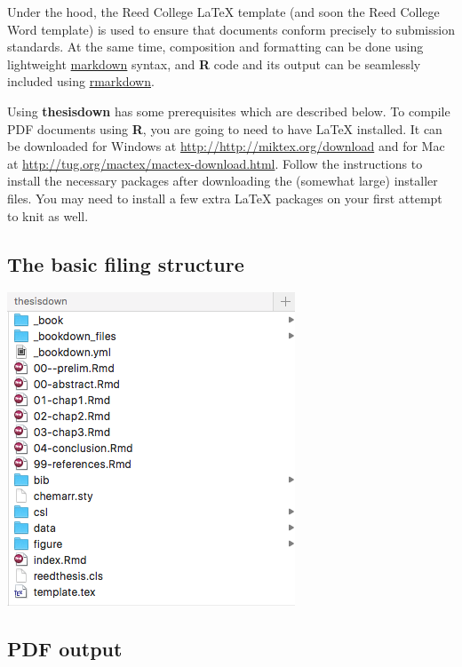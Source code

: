 \documentclass[]{book}
\theoremstyle{definition}
\theoremstyle{definition}
\theoremstyle{remark}
\begin{document}
Under the hood, the Reed College LaTeX template (and soon the Reed
College Word template) is used to ensure that documents conform
precisely to submission standards. At the same time, composition and
formatting can be done using lightweight
\href{http://rmarkdown.rstudio.com/authoring_basics.html}{markdown}
syntax, and \textbf{R} code and its output can be seamlessly included
using \href{http://rmarkdown.rstudio.com}{rmarkdown}.

Using \textbf{thesisdown} has some prerequisites which are described
below. To compile PDF documents using \textbf{R}, you are going to need
to have LaTeX installed. It can be downloaded for Windows at
\url{http://http://miktex.org/download} and for Mac at
\url{http://tug.org/mactex/mactex-download.html}. Follow the
instructions to install the necessary packages after downloading the
(somewhat large) installer files. You may need to install a few extra
LaTeX packages on your first attempt to knit as well.

\subsection{The basic filing
structure}\label{the-basic-filing-structure}

\includegraphics[width=0.75\linewidth]{images/reed_files}

\subsection{PDF output}\label{pdf-output}
\end{document}
